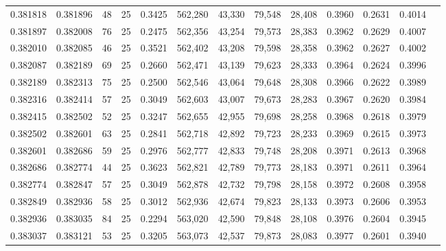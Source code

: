 \begin{tabular}{rrrrrrrrrrrrr}
0.381818 & 0.381896 &    48 &  25 &                                     0.3425 & 562,280 &  43,330 &  79,548 &  28,408 & 0.3960 & 0.2631 & 0.4014 \\
0.381897 & 0.382008 &    76 &  25 &                                     0.2475 & 562,356 &  43,254 &  79,573 &  28,383 & 0.3962 & 0.2629 & 0.4007 \\
0.382010 & 0.382085 &    46 &  25 &                                     0.3521 & 562,402 &  43,208 &  79,598 &  28,358 & 0.3962 & 0.2627 & 0.4002 \\
0.382087 & 0.382189 &    69 &  25 &                                     0.2660 & 562,471 &  43,139 &  79,623 &  28,333 & 0.3964 & 0.2624 & 0.3996 \\
0.382189 & 0.382313 &    75 &  25 &                                     0.2500 & 562,546 &  43,064 &  79,648 &  28,308 & 0.3966 & 0.2622 & 0.3989 \\
0.382316 & 0.382414 &    57 &  25 &                                     0.3049 & 562,603 &  43,007 &  79,673 &  28,283 & 0.3967 & 0.2620 & 0.3984 \\
0.382415 & 0.382502 &    52 &  25 &                                     0.3247 & 562,655 &  42,955 &  79,698 &  28,258 & 0.3968 & 0.2618 & 0.3979 \\
0.382502 & 0.382601 &    63 &  25 &                                     0.2841 & 562,718 &  42,892 &  79,723 &  28,233 & 0.3969 & 0.2615 & 0.3973 \\
0.382601 & 0.382686 &    59 &  25 &                                     0.2976 & 562,777 &  42,833 &  79,748 &  28,208 & 0.3971 & 0.2613 & 0.3968 \\
0.382686 & 0.382774 &    44 &  25 &                                     0.3623 & 562,821 &  42,789 &  79,773 &  28,183 & 0.3971 & 0.2611 & 0.3964 \\
0.382774 & 0.382847 &    57 &  25 &                                     0.3049 & 562,878 &  42,732 &  79,798 &  28,158 & 0.3972 & 0.2608 & 0.3958 \\
0.382849 & 0.382936 &    58 &  25 &                                     0.3012 & 562,936 &  42,674 &  79,823 &  28,133 & 0.3973 & 0.2606 & 0.3953 \\
0.382936 & 0.383035 &    84 &  25 &                                     0.2294 & 563,020 &  42,590 &  79,848 &  28,108 & 0.3976 & 0.2604 & 0.3945 \\
0.383037 & 0.383121 &    53 &  25 &                                     0.3205 & 563,073 &  42,537 &  79,873 &  28,083 & 0.3977 & 0.2601 & 0.3940 \\

\end{tabular}

